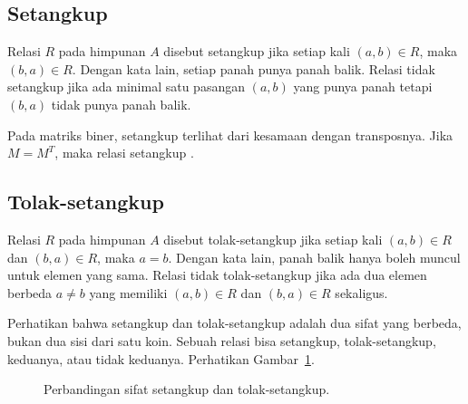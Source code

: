 \documentclass[11pt,a4paper]{article}
\begin{document}
\subsection{Setangkup}

Relasi $R$ pada himpunan $A$ disebut setangkup jika setiap kali $(a,b) \in R$, maka $(b,a) \in R$. Dengan kata lain, setiap panah punya panah balik. Relasi tidak setangkup jika ada minimal satu pasangan $(a,b)$ yang punya panah tetapi $(b,a)$ tidak punya panah balik.

Pada matriks biner, setangkup terlihat dari kesamaan dengan transposnya. Jika $M=M^T$, maka relasi setangkup \cite{rosen}.

\subsection{Tolak-setangkup}

Relasi $R$ pada himpunan $A$ disebut tolak-setangkup jika setiap kali $(a,b) \in R$ dan $(b,a) \in R$, maka $a=b$. Dengan kata lain, panah balik hanya boleh muncul untuk elemen yang sama. Relasi tidak tolak-setangkup jika ada dua elemen berbeda $a \ne b$ yang memiliki $(a,b) \in R$ dan $(b,a) \in R$ sekaligus.

Perhatikan bahwa setangkup dan tolak-setangkup adalah dua sifat yang berbeda, bukan dua sisi dari satu koin. Sebuah relasi bisa setangkup, tolak-setangkup, keduanya, atau tidak keduanya. Perhatikan Gambar~\ref{fig:setangkup}.

\begin{figure}[H]
	\centering
	\caption{Perbandingan sifat setangkup dan tolak-setangkup.}
	\label{fig:setangkup}
\end{figure}
\end{document}
